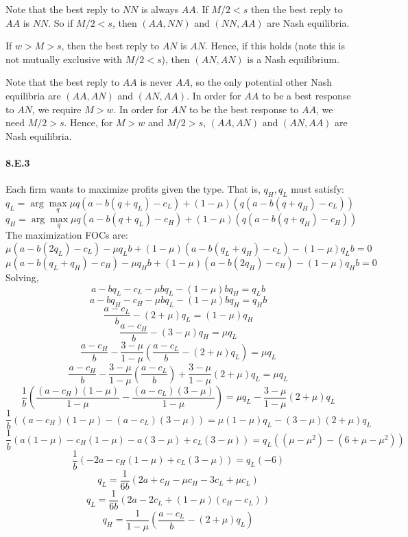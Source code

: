 \documentclass[10pt,letter]{article}
\begin{document}
Note that the best reply to $NN$ is always $AA$. If $M/2 < s$ then the best reply to $AA$ is $NN$. So if $M/2 < s$, then $(AA, NN)$ and $(NN, AA)$ are Nash equilibria.

If $w > M > s$, then the best reply to $AN$ is $AN$. Hence, if this holds (note this is not mutually exclusive with $M/2 < s$), then $(AN, AN)$ is a Nash equilibrium.

Note that the best reply to $AA$ is never $AA$, so the only potential other Nash equilibria are $(AA, AN)$ and $(AN, AA)$. In order for $AA$ to be a best response to $AN$, we require $M > w$. In order for $AN$ to be the best response to $AA$, we need $M/2 > s$. Hence, for $M>w$ and $M/2 > s$, $(AA,AN)$ and $(AN,AA)$ are Nash equilibria.

\paragraph*{8.E.3}
Each firm wants to maximize profits given the type. That is, $q_H, q_L$ must satisfy:
\[ q_L = \arg \max_q \mu q(a - b(q + q_L) - c_L) + (1-\mu) (q(a - b(q + q_H) - c_L))  \]
\[ q_H = \arg \max_q \mu q(a - b(q + q_L) - c_H) + (1-\mu) (q(a - b(q + q_H) - c_H))  \]
The maximization FOCs are:
\[ \mu (a - b(2q_L) - c_L) - \mu q_L b + (1-\mu) (a - b(q_L + q_H) - c_L) - (1-\mu) q_L b = 0 \]
\[ \mu (a - b(q_L + q_H) - c_H) - \mu q_H b + (1-\mu) (a - b(2 q_H) - c_H) - (1-\mu) q_H b = 0 \]
Solving,
\[ a - bq_L - c_L - \mu b q_L - (1-\mu) b q_H = q_L b \]
\[ a - bq_H - c_H - \mu b q_L - (1-\mu) b  q_H  = q_H b \]
\[ \frac{a - c_L}{b} - (2 + \mu)  q_L = (1-\mu)  q_H  \]
\[ \frac{a - c_H}{b} - (3 - \mu) q_H = \mu  q_L   \]
\[ \frac{a - c_H}{b} - \frac{3 - \mu}{1-\mu}\left(\frac{a - c_L}{b} - (2 + \mu)  q_L \right) = \mu  q_L   \]
\[ \frac{a - c_H}{b} - \frac{3 - \mu}{1-\mu}\left(\frac{a - c_L}{b}\right) + \frac{3 - \mu}{1-\mu}(2 + \mu)  q_L  = \mu  q_L   \]
\[\frac{1}{b}\left( \frac{(a - c_H)(1-\mu)}{1-\mu} - \frac{(a - c_L)(3-\mu)}{1-\mu}\right) =\mu q_L - \frac{3 - \mu}{1-\mu}(2 + \mu)  q_L     \]
\[\frac{1}{b}\left( (a - c_H)(1-\mu) - (a - c_L)(3-\mu)\right) =\mu(1-\mu) q_L - (3-\mu)(2 + \mu)  q_L     \]
\[\frac{1}{b}\left( a(1-\mu) - c_H(1-\mu) - a(3-\mu) + c_L(3-\mu)\right) =q_L \left( (\mu-\mu^2)  - (6 + \mu - \mu^2)  \right)    \]
\[\frac{1}{b}\left( -2a - c_H(1-\mu) + c_L(3-\mu)\right) =q_L (-6)   \]
\[q_L = \frac{1}{6b}\left( 2a + c_H-\mu c_H - 3 c_L + \mu c_L\right)     \]
\[q_L = \frac{1}{6b}\left( 2a - 2 c_L + (1-\mu)(c_H - c_L)\right)     \]
\[q_H = \frac{1}{1-\mu}\left(\frac{a - c_L}{b} - (2 + \mu)  q_L \right)   \]
\end{document}
